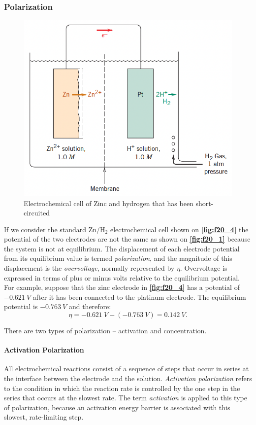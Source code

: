 \subsubsection{Polarization}
\begin{figure} [ht]
  \centering
  \includegraphics[width=0.5\linewidth]{./figures/f20_4.png}
  \caption{Electrochemical cell of Zinc and hydrogen that has been short-circuited}
  \label{fig:f20_4}
\end{figure}
If we consider the standard $\mathrm{Zn}$/$\mathrm{H}_2$ electrochemical cell shown on \textbf{\autoref{fig:f20_4}} the potential of the two electrodes are not the same as shown on \textbf{\autoref{fig:f20_1}} because the system is not at equilibrium. The displacement of each electrode potential from its equilibrium value is termed \textit{polarization}, and the magnitude of this displacement is the \textit{overvoltage}, normally represented by $\eta$. Overvoltage is expressed in terms of plus or minus volts relative to the equilibrium potential. For example, suppose that the zinc electrode in \textbf{\autoref{fig:f20_4}} has a potential of $-\qty{0,621}{V}$ after it has been connected to the platinum electrode. The equilibrium potential is $-\qty{0,763}{V}$ and therefore:
\[ 
\eta = -\qty{0,621}{V}  - \left( - \qty{0,763}{V}  \right)= \qty{0,142}{V} 
.\]

There are two types of polarization -- activation and concentration. 

\paragraph{Activation Polarization} All electrochemical reactions consist of a sequence of steps that occur in series at the interface between the electrode and the solution. \textit{Activation polarization} refers to the condition in which the reaction rate is controlled by the one step in the series that occurs at the slowest rate. The term \textit{activation} is applied to this type of polarization, because an activation energy barrier is associated with this slowest, rate-limiting step.

